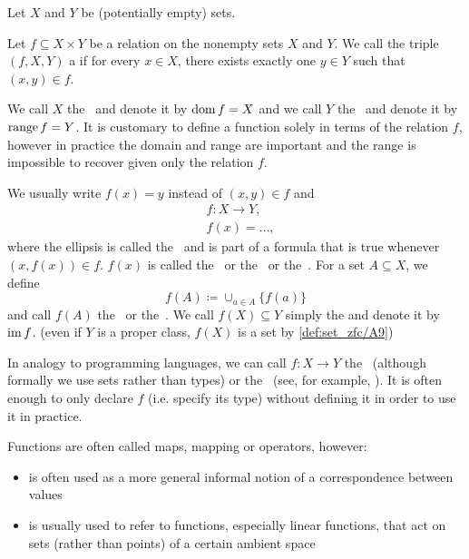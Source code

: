 \begin{definition}\label{def:function}
  Let \( X \) and \( Y \) be (potentially empty) sets.

  Let \( f \subseteq X \times Y \) be a relation on the nonempty sets \( X \) and \( Y \). We call the triple \( (f, X, Y) \) a  if for every \( x \in X \), there exists exactly one \( y \in Y \) such that \( (x, y) \in f \).

  We call \( X \) the~ and denote it by \( \operatorname{dom} f = X \) and we call \( Y \) the~ and denote it by \( \operatorname{range} f = Y \). It is customary to define a function solely in terms of the relation \( f \), however in practice the domain and range are important and the range is impossible to recover given only the relation \( f \).

  We usually write \( f(x) = y \) instead of \( (x, y) \in f \) and
  \begin{align*}
    &f: X \to Y, \\
    &f(x) = \ldots,
  \end{align*}
  where the ellipsis is called the~ and is part of a formula that is true whenever \( (x, f(x)) \in f \). \( f(x) \) is called the~ or the~ or the~. For a set \( A \subseteq X \), we define
  \begin{equation*}
    f(A) \coloneqq \cup_{a \in A} \{ f(a) \}
  \end{equation*}
  and call \( f(A) \) the~ or the~. We call \( f(X) \subseteq Y \) simply the  and denote it by \( \operatorname{im} f \). (even if \( Y \) is a proper class, \( f(X) \) is a set by \cref{def:set_zfc/A9})

  In analogy to programming languages, we can call \( f: X \to Y \) the~ (although formally we use sets rather than types) or the~ (see, for example, \cite[section 2.4]{Kernighan1988}). It is often enough to only declare \( f \) (i.e. specify its type) without defining it in order to use it in practice.

  Functions are often called maps, mapping or operators, however:
  \begin{itemize}
    \item {} is often used as a more general informal notion of a correspondence between values
    \item {} is usually used to refer to functions, especially linear functions, that act on sets (rather than points) of a certain ambient space
  \end{itemize}


\end{definition}
